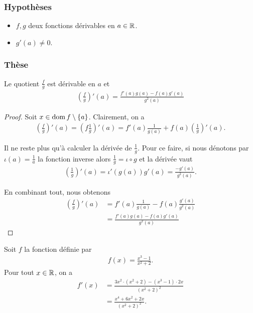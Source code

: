 \documentclass[main.tex]{subfiles}
\begin{document}
\begin{proposition}

    \subsubsection{Hypothèses}

    \begin{itemize}
        \item $f, g$ deux fonctions dérivables en $a \in \mathbb{R}$.
        \item $g'(a) \neq 0$.
    \end{itemize}

    \subsubsection{Thèse}

    Le quotient $\frac f g$ est dérivable en $a$ et
    \begin{align}
        \left(\frac f g\right)'(a) = \frac {f'(a) g(a) - f(a) g'(a)} {g^2(a)}
    \end{align}
\end{proposition}
\begin{proof}
    Soit $x \in \operatorname{dom} f \setminus \{a\}$.
    Clairement,
    on a
    \begin{align}
        \left(\frac f g\right)'(a)
        = \left(f \frac 1 g\right)'(a)
        = f'(a) \frac 1 {g(a)} + f(a) \left(\frac 1 g\right)'(a).
    \end{align}

    Il ne reste plus qu'à calculer la dérivée de $\frac 1 g$.
    Pour ce faire,
    si nous dénotons par $\iota(a) = \frac 1 a$ la fonction inverse
    alors $\frac 1 g = \iota \circ g$ et la dérivée vaut
    \begin{align}
        \left(\frac 1 g\right)'(a) = \iota'(g(a)) g'(a) = \frac {-g'(a)} {g^2(a)}.
    \end{align}

    En combinant tout,
    nous obtenons
    \begin{align}
        \left(\frac f g\right)'(a)
        &= f'(a) \frac 1 {g(a)} - f(a) \frac {g'(a)} {g^2(a)}\\
        &= \frac {f'(a) g(a) - f(a) g'(a)} {g^2(a)}
    \end{align}
\end{proof}

\begin{example}
    Soit $f$ la fonction définie par 
    \begin{align}
        f(x) = \frac{x^3 - 1}{x^2 + 2}.
    \end{align}
    Pour tout $x \in \mathbb{R}$, on a 
    \begin{align}
        f'(x) 
        &= \frac{3x^2 \cdot (x^2 + 2) - (x^3 - 1) \cdot 2x}{(x^2 + 2)^2}\\
        &= \frac{x^4 + 6 x^2 + 2x}{(x^2 + 2)^2}.
    \end{align}
\end{example}
\end{document}
